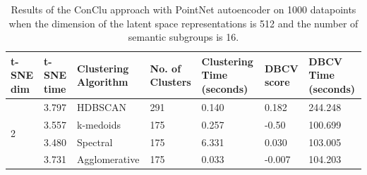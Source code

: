 \begin{table}[H]
  \setlength\extrarowheight{10pt}
  \caption{Results of the ConClu approach with PointNet autoencoder on 1000 datapoints when the dimension of the latent space representations is 512 and the number of semantic subgroups is 16. }
  \centering
  \begin{tabular}{|p{30pt}|p{50pt}|p{60pt}|p{50pt}|p{50pt}|p{50pt}|p{40pt}|}
    \toprule
    \ac{t-SNE} dim	& \ac{t-SNE} time & Clustering Algorithm & No. of Clusters & Clustering Time (seconds) & \ac{DBCV} score & \ac{DBCV} Time (seconds)\\
    \midrule
    \multirow{4}{30pt}{2}	& 3.797 & \ac{HDBSCAN}	& 291	& 0.140 & 0.182	& 244.248 \\ \cline{2-7} 
    & 3.557 & k-medoids	& 175	& 0.257 & -0.50	& 100.699 \\ \cline{2-7} 
    & 3.480 & Spectral	& 175	& 6.331 & 0.030	& 103.005 \\ \cline{2-7}
    & 3.731 & Agglomerative	& 175	& 0.033 & -0.007	& 104.203 \\ 
    \bottomrule
  \end{tabular}
  \label{tab:conclu_k_16}
\end{table}
